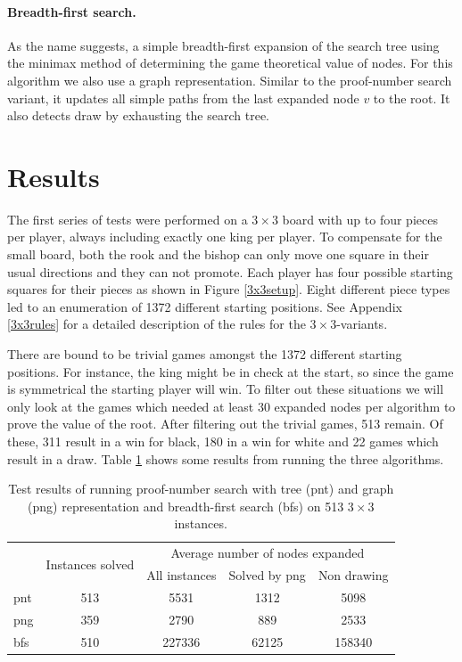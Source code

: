 \documentclass[a4paper, 11pt]{article}
\begin{document}
\paragraph{Breadth-first search.} As the name suggests, a simple breadth-first expansion of the search tree using the minimax method of determining
the game theoretical value of nodes. For this algorithm we also use a graph representation. Similar to the proof-number search variant, it
updates all simple paths from the last expanded node $v$ to the root. It also detects draw by exhausting the search tree.

\section{Results}
\label{sec:results}
The first series of tests were performed on a $3 \times 3$ board with up to four pieces per player, always including exactly one king
per player. To compensate
for the small board, both the rook and the bishop can only move one square in their usual directions and they can not promote. Each player
has four possible starting squares for their pieces as shown in Figure \ref{3x3setup}.
Eight different piece types led to an enumeration of 1372 different starting positions.
See Appendix \ref{3x3rules} for a detailed description of the rules for the $3 \times 3$-variants.

There are bound to be trivial games amongst the 1372 different starting positions. For instance, the king might be in check at the start, so since
the game is symmetrical the starting player will win. To filter out these situations we will only look at the games which needed at least
30 expanded nodes per algorithm to prove the value of the root. After filtering out the trivial games, 513 remain. Of these, 311 result
in a win for black, 180 in a win for white and 22 games which result in a draw. Table \ref{table:3x3result} shows some results from running the three
algorithms.

\begin{table}[h]
\begin{tabular}{| l | c | c | c | c |}
\cline{2-5}
 \multicolumn{1}{c|}{} & \multirow{2}{*}{Instances solved} & \multicolumn{3}{c|}{Average number of nodes expanded}\\
 \multicolumn{1}{c|}{} &    & \multicolumn{1}{c}{All instances} & \multicolumn{1}{c}{Solved by png} & \multicolumn{1}{c|}{Non drawing} \\ \hline
pnt & 513 & 5531 & 1312 & 5098\\
png & 359 & 2790 & 889 & 2533\\
bfs & 510 & 227336 & 62125 & 158340\\
\hline
\end{tabular}
\label{table:3x3result}
\caption{Test results of running proof-number search with tree (pnt) and graph (png) representation and breadth-first search (bfs) on 513 $3 \times 3$
instances.}
\end{table}
\end{document}
